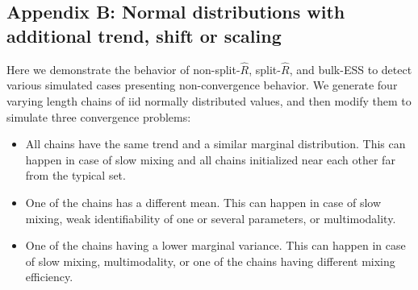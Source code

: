 \documentclass[american,]{article}
\providecommand{\tightlist}{%
  \setlength{\itemsep}{0pt}\setlength{\parskip}{0pt}}
\begin{document}









\hypertarget{AppendixD}{%
\subsection*{Appendix B: Normal distributions with additional trend,
shift or scaling}\label{AppendixD}}

Here we demonstrate the behavior of non-split-\(\widehat{R}\),
split-\(\widehat{R}\), and bulk-ESS to detect various simulated cases
presenting non-convergence behavior. We generate four varying length
chains of iid normally distributed values, and then modify them to
simulate three convergence problems:
\begin{itemize}
\tightlist
\item All chains have the same trend and a similar marginal
  distribution. This can happen in case of slow mixing and all chains
  initialized near each other far from the typical set.
\item One of the chains has a different mean. This can happen in case
  of slow mixing, weak identifiability of one or several parameters, or
  multimodality.
\item One of the chains having a lower marginal variance. This can
  happen in case of slow mixing, multimodality, or one of the chains
  having different mixing efficiency.
\end{itemize}
\end{document}
